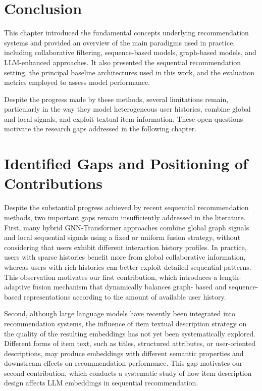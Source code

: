 \documentclass[12pt,a4paper]{report}
\begin{document}
\section{Conclusion}

This chapter introduced the fundamental concepts underlying recommendation
systems and provided an overview of the main paradigms used in practice,
including collaborative filtering, sequence-based models, graph-based models,
and LLM-enhanced approaches. It also presented the sequential recommendation
setting, the principal baseline architectures used in this work, and the
evaluation metrics employed to assess model performance.

Despite the progress made by these methods, several limitations remain,
particularly in the way they model heterogeneous user histories, combine
global and local signals, and exploit textual item information. These open
questions motivate the research gaps addressed in the following chapter.


\section{Identified Gaps and Positioning of Contributions}

Despite the substantial progress achieved by recent sequential recommendation
methods, two important gaps remain insufficiently addressed in the literature.
First, many hybrid GNN-Transformer approaches combine global graph signals and
local sequential signals using a fixed or uniform fusion strategy, without
considering that users exhibit different interaction history profiles. In
practice, users with sparse histories benefit more from global collaborative
information, whereas users with rich histories can better exploit detailed
sequential patterns. This observation motivates our first contribution, which
introduces a length-adaptive fusion mechanism that dynamically balances graph-
based and sequence-based representations according to the amount of available
user history.

Second, although large language models have recently been integrated into
recommendation systems, the influence of item textual description strategy on
the quality of the resulting embeddings has not yet been systematically
explored. Different forms of item text, such as titles, structured attributes,
or user-oriented descriptions, may produce embeddings with different semantic
properties and downstream effects on recommendation performance. This gap
motivates our second contribution, which conducts a systematic study of how item
description design affects LLM embeddings in sequential recommendation.
\end{document}
